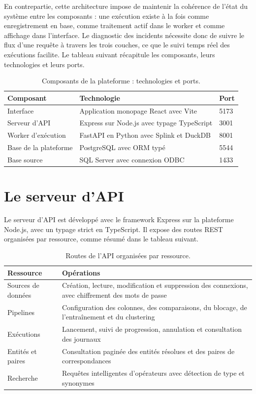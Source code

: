 En contrepartie, cette architecture impose de maintenir la cohérence de l'état du système entre les composants : une exécution existe à la fois comme enregistrement en base, comme traitement actif dans le worker et comme affichage dans l'interface. Le diagnostic des incidents nécessite donc de suivre le flux d'une requête à travers les trois couches, ce que le suivi temps réel des exécutions facilite. Le tableau suivant récapitule les composants, leurs technologies et leurs ports.

\begin{table}[H]
\centering
\caption{Composants de la plateforme : technologies et ports.}
\renewcommand{\arraystretch}{1.3}
\setlength{\tabcolsep}{3pt}
{\small
\begin{tabular}{|p{3.4cm}|p{5.1cm}|p{5.1cm}|}
\hline
\textbf{Composant} & \textbf{Technologie} & \textbf{Port} \\
\hline
Interface & Application monopage React avec Vite & 5173 \\
\hline
Serveur d'API & Express sur Node.js avec typage TypeScript & 3001 \\
\hline
Worker d'exécution & FastAPI en Python avec Splink et DuckDB & 8001 \\
\hline
Base de la plateforme & PostgreSQL avec ORM typé & 5544 \\
\hline
Base source & SQL Server avec connexion ODBC & 1433 \\
\hline
\end{tabular}
}
\end{table}

\section{Le serveur d'API}

Le serveur d'API est développé avec le framework Express sur la plateforme Node.js, avec un typage strict en TypeScript. Il expose des routes REST organisées par ressource, comme résumé dans le tableau suivant.

\begin{table}[H]
\centering
\caption{Routes de l'API organisées par ressource.}
\renewcommand{\arraystretch}{1.3}
\setlength{\tabcolsep}{3pt}
{\small
\begin{tabular}{|p{3.4cm}|p{10.2cm}|}
\hline
\textbf{Ressource} & \textbf{Opérations} \\
\hline
Sources de données & Création, lecture, modification et suppression des connexions, avec chiffrement des mots de passe \\
\hline
Pipelines & Configuration des colonnes, des comparaisons, du blocage, de l'entraînement et du clustering \\
\hline
Exécutions & Lancement, suivi de progression, annulation et consultation des journaux \\
\hline
Entités et paires & Consultation paginée des entités résolues et des paires de correspondances \\
\hline
Recherche & Requêtes intelligentes d'opérateurs avec détection de type et synonymes \\
\hline
\end{tabular}
}
\end{table}

